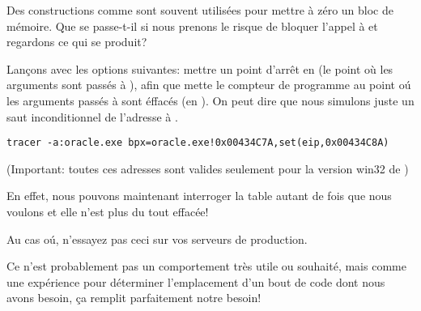 Des constructions comme  sont souvent utilisées pour
mettre à zéro un bloc de mémoire.
Que se passe-t-il si nous prenons le risque de bloquer l'appel à 
et regardons ce qui se produit?


Lançons \tracer avec les options suivantes: mettre un point d'arrêt en 
(le point où les arguments sont passés à ), afin que \tracer mette le compteur de programme  au point
oú les arguments passés à  sont éffacés (en ).
On peut dire que nous simulons juste un saut inconditionnel de l'adresse  à .

\begin{lstlisting}
tracer -a:oracle.exe bpx=oracle.exe!0x00434C7A,set(eip,0x00434C8A)
\end{lstlisting}

(Important: toutes ces adresses sont valides seulement pour la version win32 de )

En effet, nous pouvons maintenant interroger la table  autant de fois
que nous voulons et elle n'est plus du tout effacée!

Au cas oú, n'essayez pas ceci sur vos serveurs de production.

Ce n'est probablement pas un comportement très utile ou souhaité, mais comme une
expérience pour déterminer l'emplacement d'un bout de code dont nous avons besoin,
ça remplit parfaitement notre besoin!

